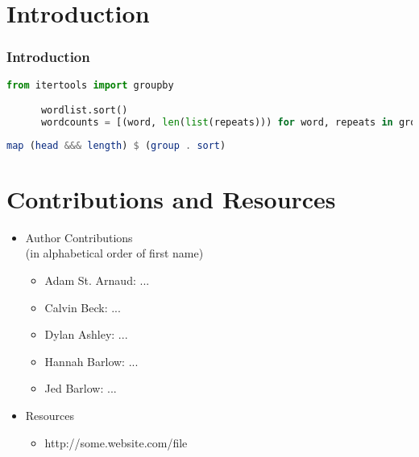 \documentclass[]{beamer}
\begin{document}
\begin{frame}
\maketitle
\end{frame}

\section{Introduction}
\begin{frame}[fragile]
    \frametitle{Introduction}

    \begin{lstlisting}[frame=single,language=Python,breaklines=true]
      from itertools import groupby

      wordlist.sort()
      wordcounts = [(word, len(list(repeats))) for word, repeats in groupby(wordlist)]
    \end{lstlisting}

    \begin{lstlisting}[frame=single,language=Haskell,breaklines=true]
      map (head &&& length) $ (group . sort)
    \end{lstlisting}
\end{frame}



\section{Contributions and Resources}
\begin{frame}
    \begin{itemize}
        \item Author Contributions\\{\scriptsize(in alphabetical order of first name)}
            \begin{itemize}
                \item Adam St. Arnaud:
                    ...
                \item Calvin Beck:
                    ...
                \item Dylan Ashley:
                    ...
                \item Hannah Barlow:
                    ...
                \item Jed Barlow:
                    ...
            \end{itemize}
        \item Resources
            \begin{itemize}
                \item
                    http://some.website.com/file
            \end{itemize}
    \end{itemize}
\end{frame}
\end{document}
